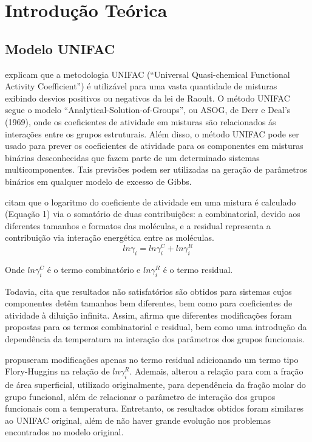 \section{Introdução Teórica}

\subsection{Modelo UNIFAC}

 explicam que a metodologia UNIFAC 
(“Universal Quasi-chemical Functional Activity Coefficient”)
é utilizável para uma vasta quantidade de misturas exibindo 
desvios positivos ou negativos da lei de Raoult. O método 
UNIFAC segue o modelo “Analytical-Solution-of-Groups”, ou ASOG,
de Derr e Deal’s (1969), onde os coeficientes de atividade
em misturas são relacionados ás interações entre os 
grupos estruturais. Além disso, o método UNIFAC pode 
ser usado para prever os coeficientes de atividade para 
os componentes em misturas binárias desconhecidas que
fazem parte de um determinado sistemas multicomponentes. 
Tais previsões podem ser utilizadas na geração de parâmetros
 binários em qualquer modelo de excesso de Gibbs.


 citam que o logaritmo do coeficiente de
atividade em uma mistura é calculado (Equação 1) via o somatório de duas contribuições: a
combinatorial, devido aos diferentes tamanhos e formatos das moléculas, e a
residual representa a contribuição via interação energética entre as
moléculas.
\begin{equation}\label{eq:001}ln\gamma_i = ln\gamma_i^C +
ln\gamma_i^R\end{equation}

Onde
$ln\gamma_i^C$ é o termo combinatório e $ln\gamma_i^R$ 
é o termo residual.


Todavia,  cita que resultados não  
satisfatórios são obtidos para
sistemas cujos componentes detêm tamanhos bem diferentes, bem
como para coeficientes de atividade à diluição infinita. 
Assim,  afirma que diferentes modificações 
foram propostas para os termos combinatorial e residual, 
bem como uma introdução da dependência da temperatura na 
interação dos parâmetros dos grupos funcionais.

 propuseram modificações apenas no termo residual
adicionando um termo tipo Flory-Huggins na relação de $ln\gamma_i^R$. 
Ademais, alterou a relação para com a fração de área 
superficial, utilizado originalmente, para dependência 
da fração molar do grupo funcional, além de relacionar o 
parâmetro de interação dos grupos funcionais com a 
temperatura. Entretanto, os resultados obtidos foram 
similares ao UNIFAC original, além de não haver grande 
evolução nos problemas encontrados no modelo original.

